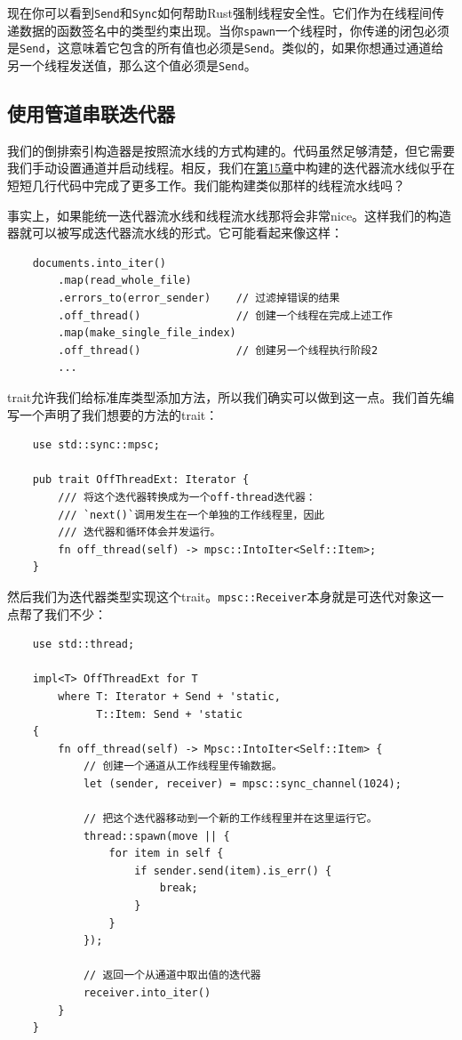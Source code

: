 现在你可以看到\texttt{Send}和\texttt{Sync}如何帮助Rust强制线程安全性。它们作为在线程间传递数据的函数签名中的类型约束出现。当你\texttt{spawn}一个线程时，你传递的闭包必须是\texttt{Send}，这意味着它包含的所有值也必须是\texttt{Send}。类似的，如果你想通过通道给另一个线程发送值，那么这个值必须是\texttt{Send}。

\subsection{使用管道串联迭代器}
我们的倒排索引构造器是按照流水线的方式构建的。代码虽然足够清楚，但它需要我们手动设置通道并启动线程。相反，我们在\hyperref[ch15]{第15章}中构建的迭代器流水线似乎在短短几行代码中完成了更多工作。我们能构建类似那样的线程流水线吗？

事实上，如果能统一迭代器流水线和线程流水线那将会非常nice。这样我们的构造器就可以被写成迭代器流水线的形式。它可能看起来像这样：
\begin{verbatim}
    documents.into_iter()
        .map(read_whole_file)
        .errors_to(error_sender)    // 过滤掉错误的结果
        .off_thread()               // 创建一个线程在完成上述工作
        .map(make_single_file_index)
        .off_thread()               // 创建另一个线程执行阶段2
        ...
\end{verbatim}

trait允许我们给标准库类型添加方法，所以我们确实可以做到这一点。我们首先编写一个声明了我们想要的方法的trait：
\begin{verbatim}
    use std::sync::mpsc;

    pub trait OffThreadExt: Iterator {
        /// 将这个迭代器转换成为一个off-thread迭代器：
        /// `next()`调用发生在一个单独的工作线程里，因此
        /// 迭代器和循环体会并发运行。
        fn off_thread(self) -> mpsc::IntoIter<Self::Item>;
    }
\end{verbatim}

然后我们为迭代器类型实现这个trait。\texttt{mpsc::Receiver}本身就是可迭代对象这一点帮了我们不少：
\begin{verbatim}
    use std::thread;

    impl<T> OffThreadExt for T
        where T: Iterator + Send + 'static,
              T::Item: Send + 'static
    {
        fn off_thread(self) -> Mpsc::IntoIter<Self::Item> {
            // 创建一个通道从工作线程里传输数据。
            let (sender, receiver) = mpsc::sync_channel(1024);

            // 把这个迭代器移动到一个新的工作线程里并在这里运行它。
            thread::spawn(move || {
                for item in self {
                    if sender.send(item).is_err() {
                        break;
                    }
                }
            });

            // 返回一个从通道中取出值的迭代器
            receiver.into_iter()
        }
    }
\end{verbatim}

